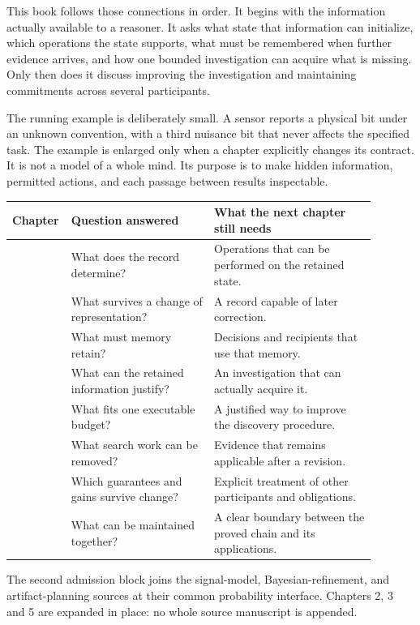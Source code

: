 \documentclass[11pt,oneside,openany]{book}
\theoremstyle{definition}\newtheorem{definition}[theorem]{Definition}
\begin{document}
This book follows those connections in order. It begins with the information actually available to a reasoner. It asks what state that information can initialize, which operations the state supports, what must be remembered when further evidence arrives, and how one bounded investigation can acquire what is missing. Only then does it discuss improving the investigation and maintaining commitments across several participants.

The running example is deliberately small. A sensor reports a physical bit under an unknown convention, with a third nuisance bit that never affects the specified task. The example is enlarged only when a chapter explicitly changes its contract. It is not a model of a whole mind. Its purpose is to make hidden information, permitted actions, and each passage between results inspectable.

\begin{center}\begin{tabular}{>{\raggedright\arraybackslash}p{0.08\linewidth}>{\raggedright\arraybackslash}p{0.38\linewidth}>{\raggedright\arraybackslash}p{0.43\linewidth}}\toprule
Chapter & Question answered & What the next chapter still needs\\\midrule
1 & What does the record determine? & Operations that can be performed on the retained state.\\
2 & What survives a change of representation? & A record capable of later correction.\\
3 & What must memory retain? & Decisions and recipients that use that memory.\\
4 & What can the retained information justify? & An investigation that can actually acquire it.\\
5 & What fits one executable budget? & A justified way to improve the discovery procedure.\\
6 & What search work can be removed? & Evidence that remains applicable after a revision.\\
7 & Which guarantees and gains survive change? & Explicit treatment of other participants and obligations.\\
8 & What can be maintained together? & A clear boundary between the proved chain and its applications.\\\bottomrule
\end{tabular}\end{center}

The second admission block joins the signal-model, Bayesian-refinement, and artifact-planning sources at their common probability interface. Chapters 2, 3 and 5 are expanded in place: no whole source manuscript is appended.
\end{document}
